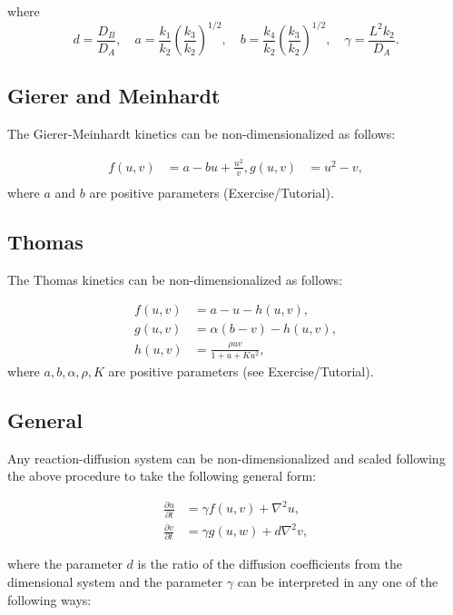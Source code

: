 \documentclass[
  letterpaper,
  DIV=11,
  numbers=noendperiod]{scrreprt}
\theoremstyle{definition}
\theoremstyle{plain}
\theoremstyle{plain}
\theoremstyle{remark}
\begin{document}
where \[
d = \frac{D_B}{D_A}, \quad a = \frac{k_1}{k_2} \left( \frac{k_3}{k_2} \right)^{1/2}, \quad b = \frac{k_4}{k_2} \left( \frac{k_3}{k_2} \right)^{1/2}, \quad \gamma = \frac{L^2 k_2}{D_A}.
\]

\hypertarget{gierer-and-meinhardt}{%
\subsection{Gierer and Meinhardt}\label{gierer-and-meinhardt}}

The Gierer-Meinhardt kinetics can be non-dimensionalized as follows:

\[
\begin{aligned}
f(u, v) & =  a - b u + \frac{u^2}{v}, 
g(u,v) &= u^2 - v, \\
\end{aligned}
\] where \(a\) and \(b\) are positive parameters (Exercise/Tutorial).

\hypertarget{thomas}{%
\subsection{Thomas}\label{thomas}}

The Thomas kinetics can be non-dimensionalized as follows:

\[
\begin{aligned}
f(u,v) & =  a - u - h(u,v), \\
g(u,v) &= \alpha (b - v) - h(u,v), \\
h(u,v) & =  \frac{\rho u v}{1 + u + K u^2},
\end{aligned}
\] where \(a , b, \alpha, \rho , K\) are positive parameters (see
Exercise/Tutorial).

\hypertarget{general}{%
\subsection{General}\label{general}}

Any reaction-diffusion system can be non-dimensionalized and scaled
following the above procedure to take the following general form:

\[
\begin{aligned}
\frac{\partial u}{\partial  t} & = \gamma f(u,v)  + \nabla^2 u, \\
\frac{\partial v}{\partial  t} & = \gamma g(u,w)  + d \nabla^2 v, 
\end{aligned}
\]

where the parameter \(d\) is the ratio of the diffusion coefficients
from the dimensional system and the parameter \(\gamma\) can be
interpreted in any one of the following ways:
\end{document}
